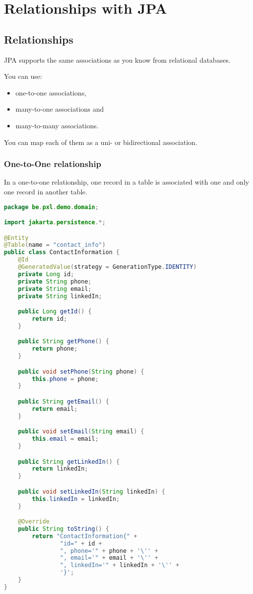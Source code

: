 \chapter{Relationships with JPA}

\section{Relationships}

JPA supports the same associations as you know from relational databases.

 You can use:
\begin{itemize}
\item one-to-one associations,
\item many-to-one associations and
\item many-to-many associations.
\end{itemize}
You can map each of them as a uni- or bidirectional association.


\subsection{One-to-One relationship}

In a one-to-one relationship, one record in a table is associated with one and only one record in another table.

\begin{lstlisting}[frame=single, language=java]
package be.pxl.demo.domain;

import jakarta.persistence.*;

@Entity
@Table(name = "contact_info")
public class ContactInformation {
    @Id
    @GeneratedValue(strategy = GenerationType.IDENTITY)
    private Long id;
    private String phone;
    private String email;
    private String linkedIn;

    public Long getId() {
        return id;
    }

    public String getPhone() {
        return phone;
    }

    public void setPhone(String phone) {
        this.phone = phone;
    }

    public String getEmail() {
        return email;
    }

    public void setEmail(String email) {
        this.email = email;
    }

    public String getLinkedIn() {
        return linkedIn;
    }

    public void setLinkedIn(String linkedIn) {
        this.linkedIn = linkedIn;
    }

    @Override
    public String toString() {
        return "ContactInformation{" +
                "id=" + id +
                ", phone='" + phone + '\'' +
                ", email='" + email + '\'' +
                ", linkedIn='" + linkedIn + '\'' +
                '}';
    }
}
\end{lstlisting}


